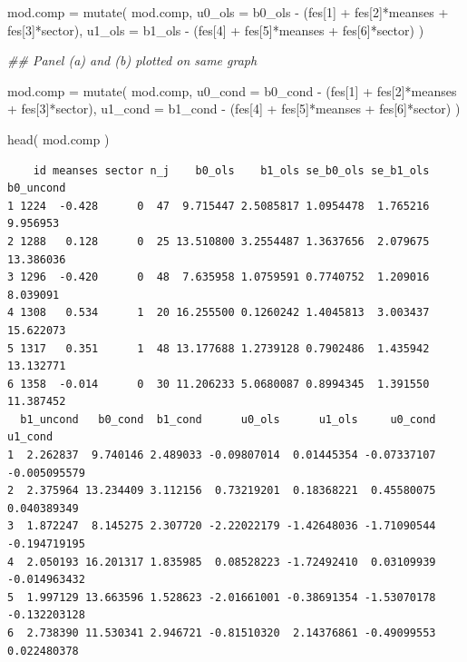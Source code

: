 \documentclass[
  letterpaper,
  DIV=11,
  numbers=noendperiod]{scrreprt}
\newenvironment{Shaded}{\begin{snugshade}}{\end{snugshade}}
\newcommand{\AttributeTok}[1]{\textcolor[rgb]{0.49,0.56,0.16}{#1}}
\newcommand{\DecValTok}[1]{\textcolor[rgb]{0.25,0.63,0.44}{#1}}
\newcommand{\DocumentationTok}[1]{\textcolor[rgb]{0.73,0.13,0.13}{\textit{#1}}}
\newcommand{\FunctionTok}[1]{\textcolor[rgb]{0.02,0.16,0.49}{#1}}
\newcommand{\NormalTok}[1]{\textcolor[rgb]{0.00,0.44,0.13}{#1}}
\newcommand{\OtherTok}[1]{\textcolor[rgb]{0.00,0.44,0.13}{#1}}
\newcommand{\SpecialCharTok}[1]{\textcolor[rgb]{0.25,0.44,0.63}{#1}}
\begin{document}
\begin{Shaded}
\begin{Highlighting}[]
\NormalTok{mod.comp }\OtherTok{=} \FunctionTok{mutate}\NormalTok{( mod.comp,}
                   \AttributeTok{u0\_ols =}\NormalTok{ b0\_ols }\SpecialCharTok{{-}}\NormalTok{ (fes[}\DecValTok{1}\NormalTok{] }\SpecialCharTok{+}\NormalTok{ fes[}\DecValTok{2}\NormalTok{]}\SpecialCharTok{*}\NormalTok{meanses }\SpecialCharTok{+}\NormalTok{ fes[}\DecValTok{3}\NormalTok{]}\SpecialCharTok{*}\NormalTok{sector),}
                   \AttributeTok{u1\_ols =}\NormalTok{ b1\_ols }\SpecialCharTok{{-}}\NormalTok{ (fes[}\DecValTok{4}\NormalTok{] }\SpecialCharTok{+}\NormalTok{ fes[}\DecValTok{5}\NormalTok{]}\SpecialCharTok{*}\NormalTok{meanses }\SpecialCharTok{+}\NormalTok{ fes[}\DecValTok{6}\NormalTok{]}\SpecialCharTok{*}\NormalTok{sector)  )}


\DocumentationTok{\#\# Panel (a) and (b) plotted on same graph}

\NormalTok{mod.comp }\OtherTok{=} \FunctionTok{mutate}\NormalTok{( mod.comp, }
                   \AttributeTok{u0\_cond =}\NormalTok{ b0\_cond }\SpecialCharTok{{-}}\NormalTok{ (fes[}\DecValTok{1}\NormalTok{] }\SpecialCharTok{+}\NormalTok{ fes[}\DecValTok{2}\NormalTok{]}\SpecialCharTok{*}\NormalTok{meanses }\SpecialCharTok{+}\NormalTok{ fes[}\DecValTok{3}\NormalTok{]}\SpecialCharTok{*}\NormalTok{sector),}
                   \AttributeTok{u1\_cond =}\NormalTok{ b1\_cond }\SpecialCharTok{{-}}\NormalTok{ (fes[}\DecValTok{4}\NormalTok{] }\SpecialCharTok{+}\NormalTok{ fes[}\DecValTok{5}\NormalTok{]}\SpecialCharTok{*}\NormalTok{meanses }\SpecialCharTok{+}\NormalTok{ fes[}\DecValTok{6}\NormalTok{]}\SpecialCharTok{*}\NormalTok{sector)  )}

\FunctionTok{head}\NormalTok{( mod.comp )}
\end{Highlighting}
\end{Shaded}

\begin{verbatim}
    id meanses sector n_j    b0_ols    b1_ols se_b0_ols se_b1_ols b0_uncond
1 1224  -0.428      0  47  9.715447 2.5085817 1.0954478  1.765216  9.956953
2 1288   0.128      0  25 13.510800 3.2554487 1.3637656  2.079675 13.386036
3 1296  -0.420      0  48  7.635958 1.0759591 0.7740752  1.209016  8.039091
4 1308   0.534      1  20 16.255500 0.1260242 1.4045813  3.003437 15.622073
5 1317   0.351      1  48 13.177688 1.2739128 0.7902486  1.435942 13.132771
6 1358  -0.014      0  30 11.206233 5.0680087 0.8994345  1.391550 11.387452
  b1_uncond   b0_cond  b1_cond      u0_ols      u1_ols     u0_cond      u1_cond
1  2.262837  9.740146 2.489033 -0.09807014  0.01445354 -0.07337107 -0.005095579
2  2.375964 13.234409 3.112156  0.73219201  0.18368221  0.45580075  0.040389349
3  1.872247  8.145275 2.307720 -2.22022179 -1.42648036 -1.71090544 -0.194719195
4  2.050193 16.201317 1.835985  0.08528223 -1.72492410  0.03109939 -0.014963432
5  1.997129 13.663596 1.528623 -2.01661001 -0.38691354 -1.53070178 -0.132203128
6  2.738390 11.530341 2.946721 -0.81510320  2.14376861 -0.49099553  0.022480378
\end{verbatim}
\end{document}
